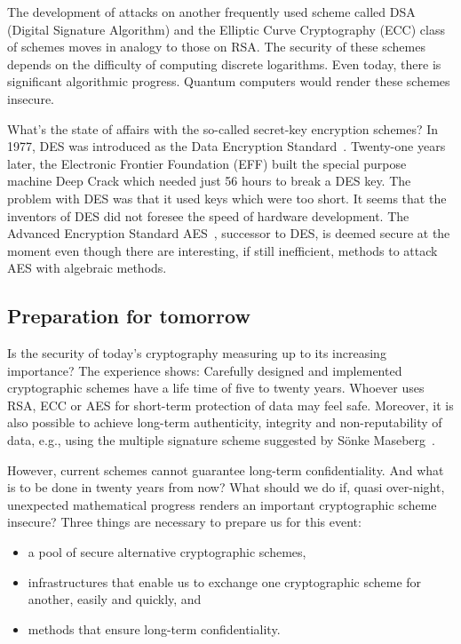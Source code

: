 The development of attacks on another frequently
used scheme called DSA (Digital Signature
Algorithm) and the Elliptic Curve Cryptography
(ECC) class of schemes moves in analogy to those
on RSA.  The security of these schemes depends on
the difficulty of computing discrete logarithms.
Even today, there is significant algorithmic
progress.  Quantum computers would render these
schemes insecure.

What's the state of affairs with the so-called
secret-key encryption schemes?  In 1977, DES was
introduced as the Data Encryption
Standard~\cite{DES-Standard:1977}.  Twenty-one
years later, the Electronic Frontier Foundation
(EFF) built the special purpose machine Deep Crack
which needed just 56 hours to break a DES key.
The problem with DES was that it used keys which
were too short.  It seems that the inventors of
DES did not foresee the speed of hardware
development.  The Advanced Encryption Standard
AES~\cite{AES-Standard:2002}, successor to DES, is
deemed secure at the moment even though there are
interesting, if still inefficient, methods to
attack AES with algebraic methods.


\subsection{Preparation for tomorrow}
\label{sec:preparations}

Is the security of today's cryptography measuring
up to its increasing importance?  The experience
shows: Carefully designed and implemented
cryptographic schemes have a life time of five to
twenty years.  Whoever uses RSA, ECC or AES for
short-term protection of data may feel safe.
Moreover, it is also possible to achieve long-term
authenticity, integrity and non-reputability of
data, e.g., using the multiple signature scheme
suggested by S\"onke Maseberg~\cite{maseberg-thesis:2002}.

However, current schemes cannot guarantee
long-term confidentiality.  And what is to be done in
twenty years from now?  What should we do if, quasi
over-night, unexpected mathematical progress
renders an important cryptographic scheme
insecure?  Three things are necessary to prepare
us for this event:

\begin{itemize}
\item a pool of secure alternative cryptographic schemes,
\item infrastructures that enable us to exchange
   one cryptographic scheme for another, easily
   and quickly, and
\item methods that ensure long-term confidentiality.
\end{itemize}

